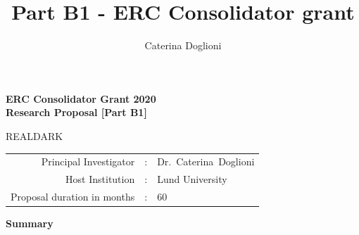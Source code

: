 \documentclass[11pt,a4paper]{article}
\title{{\Large Part B1 - ERC Consolidator grant}}
\author{{\normalsize Caterina Doglioni}}
\date{}                                           %
\begin{document}
\begin{center} 

{\Large\bf ERC Consolidator Grant 2020} \\
	{\Large\bf Research Proposal [Part B1]}  \\
 
\vspace{2cm} 
{\huge {\bf }}   \smallskip  

\vspace{2cm} 
{\Huge{REALDARK}} \\ 
\vspace{1cm} 
\vspace{1cm}
\end{center} 
\begin{tabular}{rcl}
Principal Investigator & : & Dr.~Caterina~Doglioni \\
Host Institution & : & Lund University \\ 
Proposal duration in months & : & 60 \\
\end{tabular}  
\vspace{2cm}


\begin{center} {\bf Summary}  \end{center}



\end{document}
